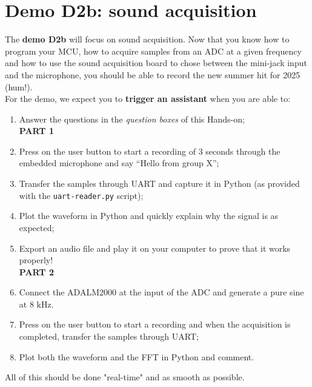 \clearpage
\section{Demo D2b: sound acquisition}

The \textbf{demo D2b} will focus on sound acquisition. Now that you know how to program your MCU, how to acquire samples from an ADC at a given frequency and how to use the sound acquisition board to chose between the mini-jack input and the microphone, you should be able to record the new summer hit for 2025 (hum!). \\

\noindent For the demo, we expect you to \textbf{trigger an assistant} when you are able to:

\begin{enumerate}
    \item Answer the questions in the \textit{question boxes} \bcquestion of this Hands-on; \\

    \textbf{PART 1}
    \item Press on the user button to start a recording of 3 seconds through the embedded microphone and say “Hello from group X”;
    \item Transfer the samples through UART and capture it in Python (as provided with the \texttt{uart-reader.py} script);
    \item Plot the waveform in Python and quickly explain why the signal is as expected;
    \item Export an audio file and play it on your computer to prove that it works properly! \\

    \textbf{PART 2}
    \item Connect the ADALM2000 at the input of the ADC and generate a pure sine at 8 kHz.
    \item Press on the user button to start a recording and when the acquisition is completed, transfer the samples through UART;
    \item Plot both the waveform and the FFT in Python and comment.
\end{enumerate}

\vspace{0.3cm}
\noindent All of this should be done "real-time" and as smooth as possible.

